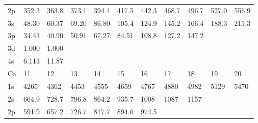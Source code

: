 \begin{table}
\begin{tabular}{lllllllllll}
2p& 352.3& 363.8& 373.1& 394.4& 417.5& 442.3& 468.7&
496.7& 527.0& 556.9\\
3s& 48.30& 60.37& 69.20& 86.80& 105.4& 124.9& 145.2& 166.4& 188.3&
211.3\\
3p& 34.43& 40.90& 50.91& 67.27& 84.51& 108.8& 127.2& 147.2\\
3d& 1.000& 1.000\\
4s&
6.113& 11.87\\
\hline
Ca&  11&  12&  13&  14&  15&  16&  17&  18&  19&  20\\
\hline
1s&  4265&  4362&  4453&
4555&  4659&  4767&  4880&  4982&  5129&  5470\\
2s& 664.9& 728.7& 796.8& 864.2& 935.7&
1008& 1087& 1157\\
2p& 591.9& 657.2& 726.7& 817.7& 894.6& 974.5\\
\hline
\end{tabular}
\end{table}


